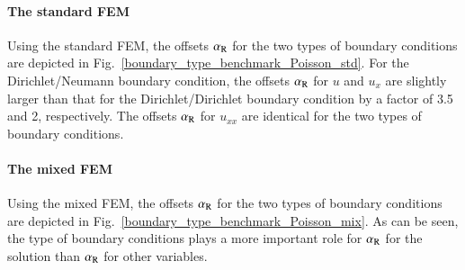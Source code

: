 \documentclass[review,3p]{elsarticle}
\begin{document}
\paragraph{The standard FEM}
Using the standard FEM, the offsets $\alpha_{\rm R}$ for the two types of boundary conditions are depicted in Fig.~\ref{boundary_type_benchmark_Poisson_std}. 
For the Dirichlet/Neumann boundary condition, the offsets $\alpha_{\rm R}$ for $u$ and $u_x$ are slightly larger than that for the Dirichlet/Dirichlet boundary condition by a factor of 3.5 and 2, respectively. The offsets $\alpha_{\rm R}$ for $u_{xx}$ are identical for the two types of boundary conditions.

\paragraph{The mixed FEM}
Using the mixed FEM, the offsets $\alpha_{\rm R}$ for the two types of boundary conditions are depicted in Fig.~\ref{boundary_type_benchmark_Poisson_mix}.
As can be seen, the type of boundary conditions plays a more important role for $\alpha_{\rm R}$ for the solution than $\alpha_{\rm R}$ for other variables.
\end{document}
